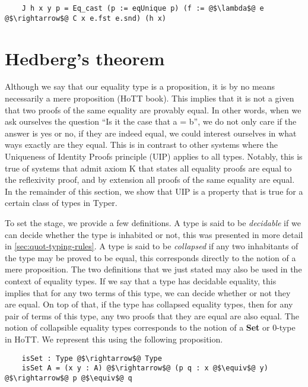 \documentclass[12pt,twoside,maitrise]{dms}
\theoremstyle{definition}
\numberwithin{equation}{section}
\numberwithin{table}{chapter}
\numberwithin{figure}{chapter}
\begin{document}
\begin{verbatim}
    J h x y p = Eq_cast (p := eqUnique p) (f := @$\lambda$@ e @$\rightarrow$@ C x e.fst e.snd) (h x)
\end{verbatim}

\section{Hedberg's theorem}\label{subsec:hedberg}

Although we say that our equality type is a proposition, it is by no means
necessarily a mere proposition (HoTT book\cite[Chap~3.3]{HoTTbook}). This
implies that it is not a given that two proofs of the same equality are provably
equal\cite{hofmann1998groupoid}. In other words, when we ask ourselves the
question ``Is it the case that a = b'', we do not only care if the answer is yes
or no, if they are indeed equal, we could interest ourselves in what ways
exactly are they equal. This is in contrast to other systems where the
Uniqueness of Identity Proofs principle (UIP) applies to all types. Notably,
this is true of systems that admit axiom K\cite{streicher1993investigations}
that states all equality proofs are equal to the reflexivity proof, and by
extension all proofs of the same equality are equal. In the remainder of this
section, we show that UIP is a property that is true for a certain class of
types in Typer.

To set the stage, we provide a few definitions. A type is said to be
\emph{decidable} if we can decide whether the type is inhabited or not, this was
presented in more detail in \autoref{sec:quot-typing-rules}. A type is said to
be \emph{collapsed} if any two inhabitants of the type may be proved to be
equal, this corresponds directly to the notion of a mere proposition. The two
definitions that we just stated may also be used in the context of equality
types. If we say that a type has decidable equality, this implies that for any
two terms of this type, we can decide whether or not they are equal. On top of
that, if the type has collapsed equality types, then for any pair of terms of
this type, any two proofs that they are equal are also equal. The notion of
collapsible equality types corresponds to the notion of a \textbf{Set} or 0-type
in HoTT\cite[Chap~3.1]{HoTTbook}. We represent this using the following proposition.

\begin{verbatim}
    isSet : Type @$\rightarrow$@ Type
    isSet A = (x y : A) @$\rightarrow$@ (p q : x @$\equiv$@ y) @$\rightarrow$@ p @$\equiv$@ q
\end{verbatim}
\end{document}
